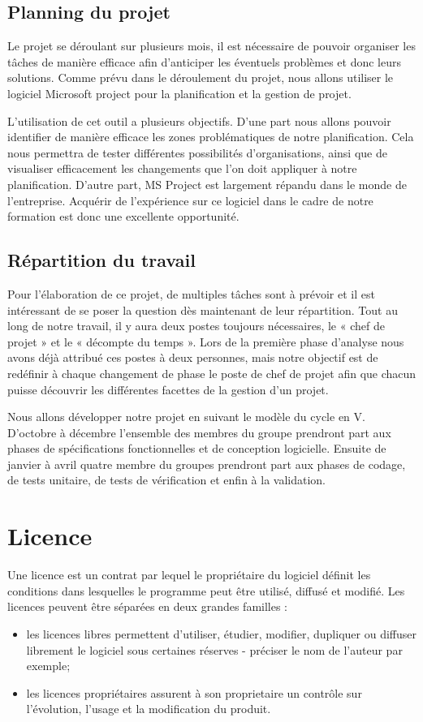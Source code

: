 \subsection{Planning du projet}
	Le projet se déroulant sur plusieurs mois, il est nécessaire de pouvoir organiser les tâches de manière efficace afin d’anticiper les éventuels problèmes et donc leurs solutions. Comme prévu dans le déroulement du projet, nous allons utiliser le logiciel Microsoft project pour la planification et la gestion de projet.

	L’utilisation de cet outil a plusieurs objectifs. D’une part nous allons pouvoir identifier de manière efficace les zones problématiques de notre planification. Cela nous permettra de tester différentes possibilités d’organisations, ainsi que de visualiser efficacement les changements que l’on doit appliquer à notre planification. D’autre part, MS Project est largement répandu dans le monde de l’entreprise.  Acquérir de l’expérience sur ce logiciel dans le cadre de notre formation est donc une excellente opportunité.


\subsection{Répartition du travail}
	Pour l’élaboration de ce projet, de multiples tâches sont à prévoir et il est intéressant de se poser la question dès maintenant de leur répartition. Tout au long de notre travail, il y aura deux postes toujours nécessaires, le « chef de projet » et le « décompte du temps ». Lors de la première phase d’analyse nous avons déjà attribué ces postes à deux personnes, mais notre objectif est de redéfinir à chaque changement de phase le poste de chef de projet afin que chacun puisse découvrir les différentes facettes de la gestion d’un projet.  

	Nous allons développer notre projet en suivant le modèle du cycle en V. D'octobre à décembre l'ensemble des membres du groupe prendront part aux phases de spécifications fonctionnelles et de conception logicielle. Ensuite de janvier à avril quatre membre du groupes prendront part aux phases de codage, de tests unitaire, de tests de vérification et enfin à la validation.


\section{Licence}

	Une licence est un contrat par lequel le propriétaire du logiciel définit les conditions dans lesquelles le programme peut être utilisé, diffusé et modifié. Les licences peuvent être séparées en deux grandes familles :
	\begin{itemize}
		\item les licences libres permettent d’utiliser, étudier, modifier, dupliquer ou diffuser librement le logiciel sous certaines réserves - préciser le nom de l'auteur par exemple;
		\item les licences propriétaires assurent à son proprietaire un contrôle sur l’évolution, l’usage et la modification du produit.
	\end{itemize}

